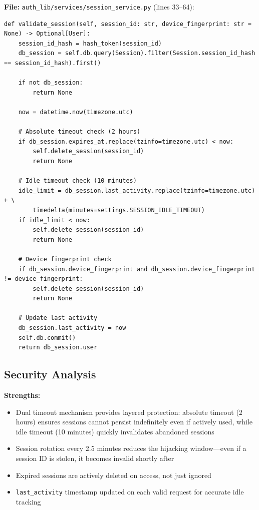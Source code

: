 \documentclass[11pt,a4paper]{article}
\begin{document}
\textbf{File:} \texttt{auth\_lib/services/session\_service.py} (lines 33--64):
\begin{lstlisting}
def validate_session(self, session_id: str, device_fingerprint: str = None) -> Optional[User]:
    session_id_hash = hash_token(session_id)
    db_session = self.db.query(Session).filter(Session.session_id_hash == session_id_hash).first()
    
    if not db_session:
        return None
        
    now = datetime.now(timezone.utc)
    
    # Absolute timeout check (2 hours)
    if db_session.expires_at.replace(tzinfo=timezone.utc) < now:
        self.delete_session(session_id)
        return None
        
    # Idle timeout check (10 minutes)
    idle_limit = db_session.last_activity.replace(tzinfo=timezone.utc) + \
        timedelta(minutes=settings.SESSION_IDLE_TIMEOUT)
    if idle_limit < now:
        self.delete_session(session_id)
        return None

    # Device fingerprint check
    if db_session.device_fingerprint and db_session.device_fingerprint != device_fingerprint:
        self.delete_session(session_id)
        return None

    # Update last activity
    db_session.last_activity = now
    self.db.commit()
    return db_session.user
\end{lstlisting}

\subsection{Security Analysis}

\textbf{Strengths:}
\begin{itemize}[noitemsep]
    \item Dual timeout mechanism provides layered protection: absolute timeout (2 hours) ensures sessions cannot persist indefinitely even if actively used, while idle timeout (10 minutes) quickly invalidates abandoned sessions
    \item Session rotation every 2.5 minutes reduces the hijacking window---even if a session ID is stolen, it becomes invalid shortly after
    \item Expired sessions are actively deleted on access, not just ignored
    \item \texttt{last\_activity} timestamp updated on each valid request for accurate idle tracking
\end{itemize}
\end{document}
